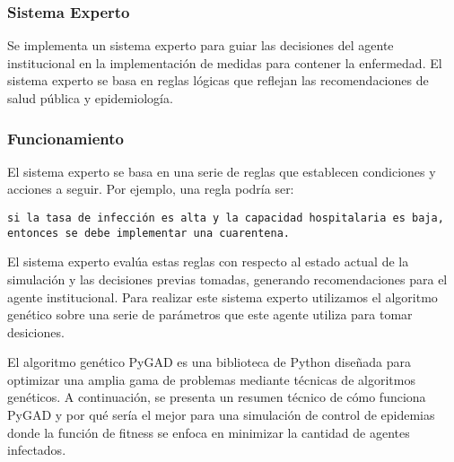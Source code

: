 \subsubsection{Sistema Experto}
Se implementa un sistema experto para guiar las decisiones del agente institucional en la implementación de medidas para contener la enfermedad. El sistema experto se basa en reglas lógicas que reflejan las recomendaciones de salud pública y epidemiología.

\subsubsection{Funcionamiento}
El sistema experto se basa en una serie de reglas que establecen condiciones y acciones a seguir. Por ejemplo, una regla podría ser:
\begin{verbatim}
si la tasa de infección es alta y la capacidad hospitalaria es baja, entonces se debe implementar una cuarentena.
\end{verbatim}
El sistema experto evalúa estas reglas con respecto al estado actual de la simulación y las decisiones previas tomadas, generando recomendaciones para el agente institucional. Para realizar este sistema experto utilizamos el algoritmo genético sobre una serie de parámetros que este agente utiliza para tomar desiciones.

El algoritmo genético PyGAD es una biblioteca de Python diseñada para optimizar una amplia gama de problemas mediante técnicas de algoritmos genéticos. A continuación, se presenta un resumen técnico de cómo funciona PyGAD y por qué sería el mejor para una simulación de control de epidemias donde la función de fitness se enfoca en minimizar la cantidad de agentes infectados.

